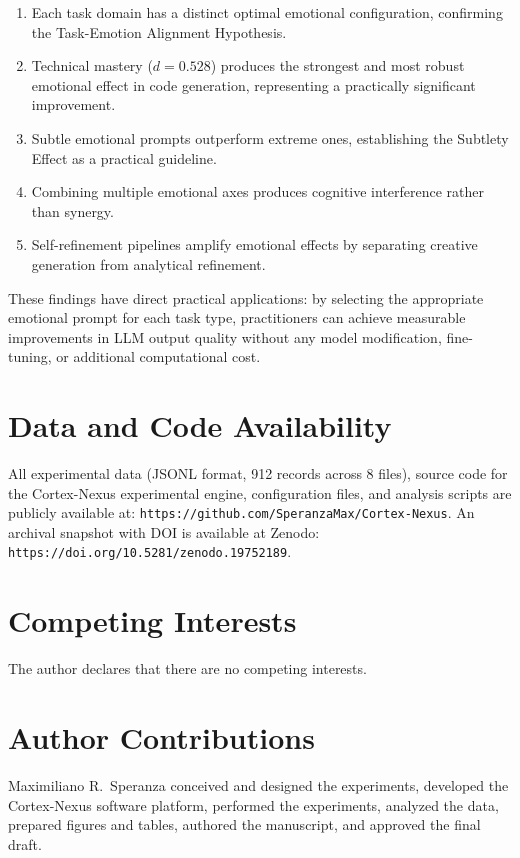\documentclass[lineno]{wlpeerj}
\begin{document}
\begin{enumerate}
    \item Each task domain has a distinct optimal emotional configuration, confirming the Task-Emotion Alignment Hypothesis.
    \item Technical mastery ($d = 0.528$) produces the strongest and most robust emotional effect in code generation, representing a practically significant improvement.
    \item Subtle emotional prompts outperform extreme ones, establishing the Subtlety Effect as a practical guideline.
    \item Combining multiple emotional axes produces cognitive interference rather than synergy.
    \item Self-refinement pipelines amplify emotional effects by separating creative generation from analytical refinement.
\end{enumerate}

These findings have direct practical applications: by selecting the appropriate emotional prompt for each task type, practitioners can achieve measurable improvements in LLM output quality without any model modification, fine-tuning, or additional computational cost.

\section*{Data and Code Availability}

All experimental data (JSONL format, 912 records across 8 files), source code for the Cortex-Nexus experimental engine, configuration files, and analysis scripts are publicly available at: \texttt{https://github.com/SperanzaMax/Cortex-Nexus}. An archival snapshot with DOI is available at Zenodo: \texttt{https://doi.org/10.5281/zenodo.19752189}.

\section*{Competing Interests}

The author declares that there are no competing interests.

\section*{Author Contributions}

Maximiliano R.\ Speranza conceived and designed the experiments, developed the Cortex-Nexus software platform, performed the experiments, analyzed the data, prepared figures and tables, authored the manuscript, and approved the final draft.
\end{document}

